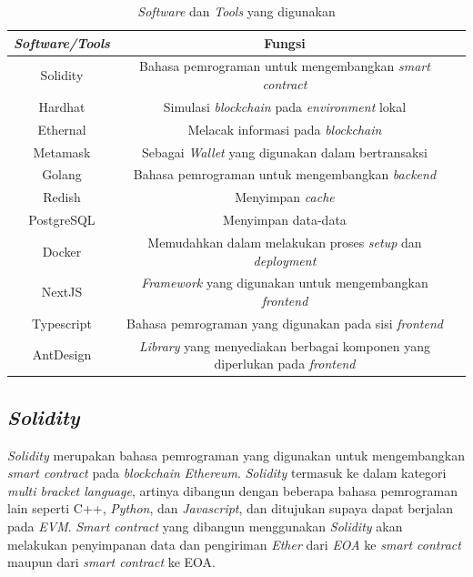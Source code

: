 \begin{longtable}{|c|c|c|}
  \caption{\emph{Software} dan \emph{Tools} yang digunakan}
  \label{tb:EnergiKecepatan}                                   \\
  \hline
  \rowcolor[HTML]{C0C0C0}
  \textbf{\emph{Software/Tools}} & \textbf{Fungsi} \\
  \hline
  Solidity            & Bahasa pemrograman untuk mengembangkan \emph{smart contract}                                        \\
  Hardhat             & Simulasi \emph{blockchain} pada \emph{environment} lokal                                            \\
  Ethernal            & Melacak informasi pada \emph{blockchain}                                                            \\
  Metamask            & Sebagai \emph{Wallet} yang digunakan dalam bertransaksi                                             \\
  Golang              & Bahasa pemrograman untuk mengembangkan \emph{backend}                                               \\
  Redish              & Menyimpan \emph{cache}                                                                              \\
  PostgreSQL          & Menyimpan data-data                                                                                 \\
  Docker              & Memudahkan dalam melakukan proses \emph{setup} dan \emph{deployment}                                \\
  NextJS              & \emph{Framework} yang digunakan untuk mengembangkan \emph{frontend}                                 \\
  Typescript          & Bahasa pemrograman yang digunakan pada sisi \emph{frontend}                                         \\
  AntDesign           & \emph{Library} yang menyediakan berbagai komponen yang diperlukan pada \emph{frontend}              \\
  \hline
\end{longtable}

\subsection{\emph{Solidity}}

\emph{Solidity} merupakan bahasa pemrograman yang digunakan untuk mengembangkan \emph{smart contract} pada \emph{blockchain} \emph{Ethereum}. \emph{Solidity} termasuk ke dalam kategori \emph{multi bracket language}, artinya dibangun dengan beberapa bahasa pemrograman lain seperti C++, \emph{Python}, dan \emph{Javascript}, dan ditujukan supaya dapat berjalan pada \emph{EVM}. \emph{Smart contract} yang dibangun menggunakan \emph{Solidity} akan melakukan penyimpanan data dan pengiriman \emph{Ether} dari \emph{EOA} ke \emph{smart contract} maupun dari \emph{smart contract} ke EOA. 

